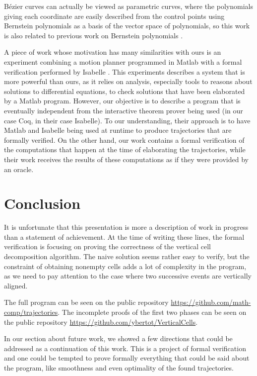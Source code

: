 \documentclass{easychair}
\begin{document}
Bézier curves can actually be viewed as parametric curves, where the
polynomials giving each coordinate are easily described from the
control points using Bernstein polynomials as a basis of the vector
space of polynomials, so this work is also related to previous work on
Bernstein polynomials \cite{basu:hal-01083587,BertotMahboubiGuilhot,Zsido2014}.

A piece of work whose motivation has many similarities with ours
is an experiment combining a motion planner programmed in Matlab with
a formal verification performed by Isabelle \cite{RizaldiISA18}.  This
experiments describes a system that is more powerful than ours, as it
relies on analysis, especially tools to reasons about solutions to
differential equations, to check solutions that have been elaborated by a
Matlab program.  However, our objective is to describe a program that
is eventually independent from the interactive theorem prover being
used (in our case Coq, in their case Isabelle).  To our understanding,
their approach is to have Matlab and Isabelle being used at runtime to
produce trajectories that are formally verified.  On the other hand,
our work contains a formal verification of the computations that happen at
the time of elaborating the trajectories, while their work receives
the results of these computations as if they were provided by an oracle.

\section{Conclusion}
It is unfortunate that this presentation is more a description of work
in progress than a statement of achievement.  At the time of writing
these lines, the formal verification is focusing on proving the
correctness of the vertical cell decomposition algorithm.  The naive
solution seems rather easy to verify, but the constraint of obtaining
nonempty cells adds a lot of complexity in the program, as we need to
pay attention to the case where two successive events are vertically
aligned.

The full program can be seen on the public repository \url{https://github.com/math-comp/trajectories}.  The incomplete proofs of the first two phases can be seen on the public repository \url{https://github.com/ybertot/VerticalCells}.

In our section about future work, we showed a few directions that
could be addressed as a continuation of this work.  This is a project
of formal verification and one could be tempted to prove formally
everything that could be said about the program, like smoothness and
even optimality of the found trajectories.
\end{document}
